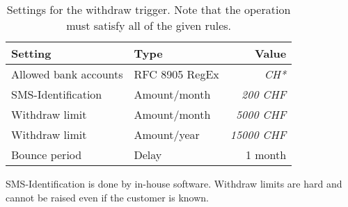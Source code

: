 \begin{table}[h!]
  \caption{Settings for the withdraw trigger. Note that the operation
  must satisfy all of the given rules.} \label{table:kyc:withdraw:settings}
  \begin{tabular}{l|l|r}
    {\bf Setting}            & {\bf Type}         &  {\bf Value}     \\ \hline \hline
    Allowed bank accounts    & RFC 8905 RegEx     &  {\em CH*}       \\ \hline
    SMS-Identification       & Amount/month       &  {\em 200 CHF}   \\
    Withdraw limit           & Amount/month       &  {\em 5000 CHF}  \\
    Withdraw limit           & Amount/year        &  {\em 15000 CHF} \\
    Bounce period            & Delay              &  1 month         \\
  \end{tabular}
\end{table}


SMS-Identification is done by in-house software.  Withdraw limits are
hard and cannot be raised even if the customer is known.
